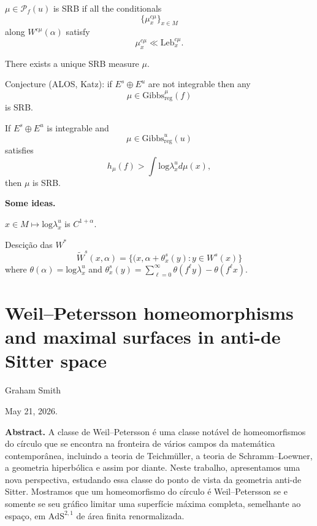 \begin{definition}
\label{definition-}
$\mu \in \mathcal{P}_f(u)$
is SRB if all the conditionals
$$
\{\mu_x^{c\mu}\}_{x \in M}
$$
along $W^{c\mu}(\alpha)$
satisfy
$$
\mu_x^{c\mu}\ll \text{Leb}_x^{c\mu}.
$$
\end{definition}

\begin{theorem}
\label{theorem-srb}
There exists a unique SRB measure
$\mu$.
\end{theorem}

\noindent
Conjecture (ALOS, Katz): 
if $E^s \oplus E^u$
are not integrable then any
$$
\mu \in \text{Gibbs}_{\text{reg}}^{\mu}(f)
$$
is SRB.

\begin{theorem}[B]
\label{theorem-gibbs-b}
If $E^s \oplus E^u$ is integrable
and
$$
\mu \in \text{Gibbs}_{\text{reg}}^u(u)
$$
satisfies
$$
h_\mu(f)
> \int \text{log}\lambda_x^u d\mu(x),
$$
then $\mu$ is SRB.
\end{theorem}

\medskip\noindent
{\bf Some ideas.}

 \noindent
$x \in M \mapsto \text{log}\lambda_x^u$
is $C^{1+\alpha}$.

Descição das $W^*$
$$
\widetilde{W}^s(x,\alpha)
=\{(x,\alpha+\theta_x^{s}(y)
:y \in W^s(x)\}
$$
where
$\theta(\alpha)=\text{log}\lambda_x^u$
and
$\theta_x^s(y)
=\sum_{\ell=0}^{\infty}
\theta(f^\ell y)
-\theta(f^\ell x)$.



\section{Weil--Petersson homeomorphisms 
and maximal surfaces in anti-de Sitter space}
\label{section-weil-petersson}

\noindent
Graham Smith

May 21, 2026.

\medskip\noindent
{\bf Abstract.}
A classe de Weil--Petersson é uma classe
notável de homeomorfismos do círculo que se
encontra na fronteira de vários campos da
matemática contemporânea, incluindo a teoria
de Teichm\"uller, a teoria de
Schramm--Loewner, a geometria hiperbólica e
assim por diante.
Neste trabalho, apresentamos uma nova
perspectiva, estudando essa classe do ponto
de vista da geometria anti-de Sitter.
Mostramos que um homeomorfismo do círculo é
Weil--Petersson se e somente se seu gráfico
limitar uma superfície máxima completa,
semelhante ao espaço, em
$\mathrm{AdS}^{2,1}$ de área finita
renormalizada.

